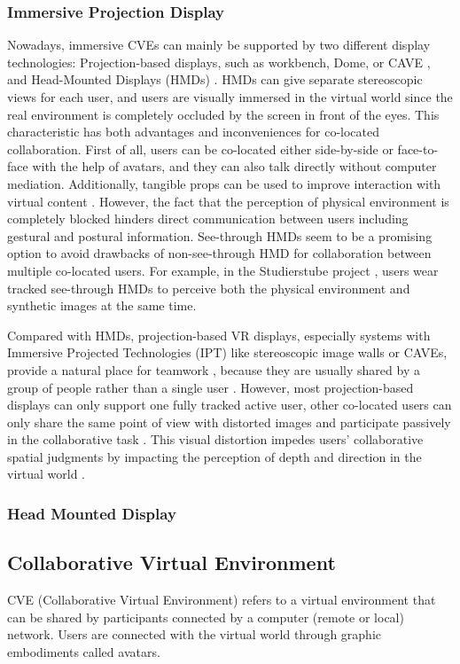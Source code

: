 \subsubsection{Immersive Projection Display}
Nowadays, immersive CVEs can mainly be supported by two different display technologies: Projection-based displays, such as workbench, Dome, or CAVE \citep{CruzNeira1993SPV}, and Head-Mounted Displays (HMDs) \citep{Melzer1997HMD}. HMDs can give separate stereoscopic views for each user, and users are visually immersed in the virtual world since the real environment is completely occluded by the screen in front of the eyes. This characteristic has both advantages and inconveniences for co-located collaboration. First of all, users can be co-located either side-by-side or face-to-face with the help of avatars, and they can also talk directly without computer mediation. Additionally, tangible props can be used to improve interaction with virtual content \citep{Salzmann2008TUS}. However, the fact that the perception of physical environment is completely blocked hinders direct communication between users including gestural and postural information. See-through HMDs seem to be a promising option to avoid drawbacks of non-see-through HMD for collaboration between multiple co-located users. For example, in the Studierstube project \citep{Schmalstieg2002Studierstube}, users wear tracked see-through HMDs to perceive both the physical environment and synthetic images at the same time.

Compared with HMDs, projection-based VR displays, especially systems with Immersive Projected Technologies (IPT) like stereoscopic image walls or CAVEs, provide a natural place for teamwork \citep{Johanson2002IWP}, because they are usually shared by a group of people rather than a single user \citep{Benford1996SST}. However, most projection-based displays can only support one fully tracked active user, other co-located users can only share the same point of view with distorted images and participate passively in the collaborative task \citep{Bayon2006Multiple}. This visual distortion impedes users’ collaborative spatial judgments by impacting the perception of depth and direction in the virtual world \citep{Pollock2012Right}.



\subsubsection{Head Mounted Display}

\subsection{Collaborative Virtual Environment}
CVE (Collaborative Virtual Environment) refers to a virtual environment that can be shared by participants connected by a computer (remote or local) network. Users are connected with the virtual world through graphic embodiments called avatars.

